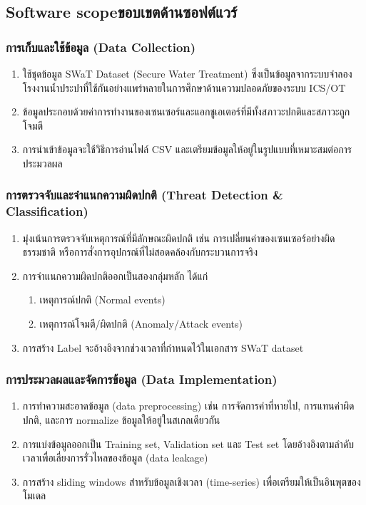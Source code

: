 \subsection{\ifenglish Software scope\else ขอบเขตด้านซอฟต์แวร์\fi}

\subsubsection{การเก็บและใช้ข้อมูล (Data Collection)}
\begin{enumerate}
    \item ใช้ชุดข้อมูล SWaT Dataset (Secure Water Treatment) ซึ่งเป็นข้อมูลจากระบบจำลองโรงงานน้ำประปาที่ใช้กันอย่างแพร่หลายในการศึกษาด้านความปลอดภัยของระบบ ICS/OT
    \item ข้อมูลประกอบด้วยค่าการทำงานของเซนเซอร์และแอกชูเอเตอร์ที่มีทั้งสภาวะปกติและสภาวะถูกโจมตี
    \item การนำเข้าข้อมูลจะใช้วิธีการอ่านไฟล์ CSV และเตรียมข้อมูลให้อยู่ในรูปแบบที่เหมาะสมต่อการประมวลผล
\end{enumerate}

\subsubsection{การตรวจจับและจำแนกความผิดปกติ (Threat Detection \& Classification) }
\begin{enumerate}
    \item มุ่งเน้นการตรวจจับเหตุการณ์ที่มีลักษณะผิดปกติ เช่น การเปลี่ยนค่าของเซนเซอร์อย่างผิดธรรมชาติ หรือการสั่งการอุปกรณ์ที่ไม่สอดคล้องกับกระบวนการจริง
    \item การจำแนกความผิดปกติออกเป็นสองกลุ่มหลัก ได้แก่
    \begin{enumerate}
        \item เหตุการณ์ปกติ (Normal events)
        \item เหตุการณ์โจมตี/ผิดปกติ (Anomaly/Attack events)
    \end{enumerate}
    \item การสร้าง Label จะอ้างอิงจากช่วงเวลาที่กำหนดไว้ในเอกสาร SWaT dataset
\end{enumerate}

\subsubsection{การประมวลผลและจัดการข้อมูล (Data Implementation)}
\begin{enumerate}
    \item การทำความสะอาดข้อมูล (data preprocessing) เช่น การจัดการค่าที่หายไป, การแทนค่าผิดปกติ, และการ normalize ข้อมูลให้อยู่ในสเกลเดียวกัน
    \item การแบ่งข้อมูลออกเป็น Training set, Validation set และ Test set โดยอ้างอิงตามลำดับเวลาเพื่อเลี่ยงการรั่วไหลของข้อมูล (data leakage)
    \item การสร้าง sliding windows สำหรับข้อมูลเชิงเวลา (time-series) เพื่อเตรียมให้เป็นอินพุตของโมเดล
\end{enumerate}


